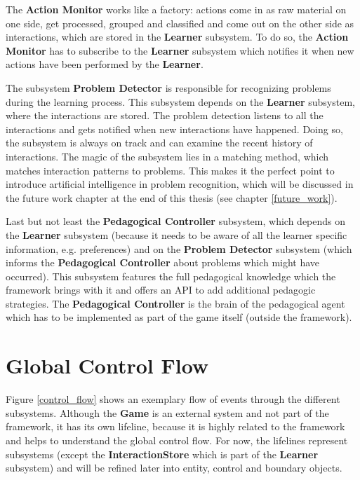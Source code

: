 The \textbf{Action Monitor} works like a factory: actions come in as raw
material on one side, get processed, grouped and classified and come out on the
other side as interactions, which are stored in the \textbf{Learner}
subsystem. To do so, the \textbf{Action Monitor} has to subscribe to the
\textbf{Learner} subsystem which notifies it when new actions have been
performed by the \textbf{Learner}.



The subsystem \textbf{Problem Detector} is responsible for recognizing
problems during the learning process. This subsystem depends on the
\textbf{Learner} subsystem, where the interactions are stored. The problem
detection listens to all the interactions and gets notified when new
interactions have happened. Doing so, the subsystem is always on track and can
examine the recent history of interactions. The magic of the subsystem lies in
a matching method, which matches interaction patterns to problems. This makes
it the perfect point to introduce artificial intelligence in problem
recognition, which will be discussed in the future work chapter at the end of
this thesis (see chapter \ref{future_work}).

Last but not least the \textbf{Pedagogical Controller} subsystem, which depends
on the \textbf{Learner} subsystem (because it needs to be aware of all the
learner specific information, e.g. preferences) and on the
\textbf{Problem Detector} subsystem (which informs the \textbf{Pedagogical
Controller} about problems which might have occurred). This subsystem features
the full pedagogical knowledge which the framework brings with it and offers
an API to add additional pedagogic strategies. The \textbf{Pedagogical
Controller} is the brain of the pedagogical agent which has to be implemented
as part of the game itself (outside the framework).

\section{Global Control Flow}
Figure \ref{control_flow} shows an exemplary flow of events through the
different subsystems. Although the \textbf{Game} is an external system and not
part of the framework, it has its own lifeline, because it is highly related
to the framework and helps to understand the global control flow. For now, the
lifelines represent subsystems (except the \textbf{InteractionStore}
which is part of the \textbf{Learner} subsystem) and will be refined later into
entity, control and boundary objects.

